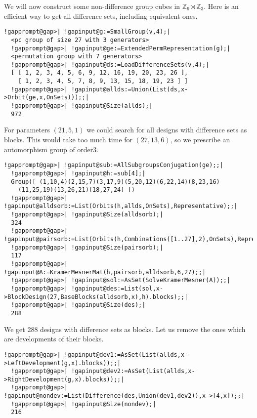 \documentclass[a4paper,11pt]{report}
\begin{document}
{{ We will now construct some non-difference group cubes in ${\ensuremath{\mathbb Z}}_9\rtimes {\ensuremath{\mathbb Z}}_3$. Here is an efficient way to get all difference sets, including equivalent
ones. 
\begin{Verbatim}[commandchars=!@|,fontsize=\small,frame=single,label=Example]
  !gapprompt@gap>| !gapinput@g:=SmallGroup(v,4);|
  <pc group of size 27 with 3 generators>
  !gapprompt@gap>| !gapinput@ge:=ExtendedPermRepresentation(g);|
  <permutation group with 7 generators>
  !gapprompt@gap>| !gapinput@ds:=LoadDifferenceSets(v,4);|
  [ [ 1, 2, 3, 4, 5, 6, 9, 12, 16, 19, 20, 23, 26 ], 
    [ 1, 2, 3, 4, 5, 7, 8, 9, 13, 15, 18, 19, 23 ] ]
  !gapprompt@gap>| !gapinput@allds:=Union(List(ds,x->Orbit(ge,x,OnSets)));;|
  !gapprompt@gap>| !gapinput@Size(allds);|
  972
\end{Verbatim}
 For parameters $(21,5,1)$ we could search for all designs with difference sets as blocks. This would
take too much time for $(27,13,6)$, so we prescribe an automorphism group of order{\nobreakspace}3. 
\begin{Verbatim}[commandchars=!@|,fontsize=\small,frame=single,label=Example]
  !gapprompt@gap>| !gapinput@sub:=AllSubgroupsConjugation(ge);;|
  !gapprompt@gap>| !gapinput@h:=sub[4];|
  Group([ (1,10,4)(2,15,7)(3,17,9)(5,20,12)(6,22,14)(8,23,16)
    (11,25,19)(13,26,21)(18,27,24) ])
  !gapprompt@gap>| !gapinput@alldsorb:=List(Orbits(h,allds,OnSets),Representative);;|
  !gapprompt@gap>| !gapinput@Size(alldsorb);|
  324
  !gapprompt@gap>| !gapinput@pairsorb:=List(Orbits(h,Combinations([1..27],2),OnSets),Representative);;|
  !gapprompt@gap>| !gapinput@Size(pairsorb);|
  117
  !gapprompt@gap>| !gapinput@A:=KramerMesnerMat(h,pairsorb,alldsorb,6,27);;|
  !gapprompt@gap>| !gapinput@sol:=AsSet(SolveKramerMesner(A));;|
  !gapprompt@gap>| !gapinput@des:=List(sol,x->BlockDesign(27,BaseBlocks(alldsorb,x),h).blocks);;|
  !gapprompt@gap>| !gapinput@Size(des);|
  288
\end{Verbatim}
 We get 288 designs with difference sets as blocks. Let us remove the ones
which are developments of their blocks. 
\begin{Verbatim}[commandchars=!@|,fontsize=\small,frame=single,label=Example]
  !gapprompt@gap>| !gapinput@dev1:=AsSet(List(allds,x->LeftDevelopment(g,x).blocks));;|
  !gapprompt@gap>| !gapinput@dev2:=AsSet(List(allds,x->RightDevelopment(g,x).blocks));;|
  !gapprompt@gap>| !gapinput@nondev:=List(Difference(des,Union(dev1,dev2)),x->[4,x]);;|
  !gapprompt@gap>| !gapinput@Size(nondev);|
  216
\end{Verbatim}
}}
\end{document}
